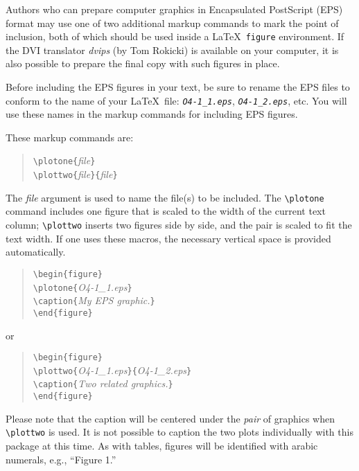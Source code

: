 \documentclass[11pt,twoside]{article}
\def\arg#1{{\it#1\/}}
\let\prog=\arg
\begin{document}
Authors who can prepare computer graphics in Encapsulated PostScript
(EPS) format may use one of two additional markup commands to mark the
point of inclusion, both of which should be used inside a \LaTeX\
{\tt figure} environment.  If the DVI translator \prog{dvips} (by Tom
Rokicki) is available on your computer, it is also possible to prepare the
final copy with such figures in place.  

Before including the EPS figures in your text, be sure to rename the
EPS files to conform to the name of your \LaTeX\ file:
{\tt {\it O4-1\_1.eps}}, {\tt {\it O4-1\_2.eps}}, etc. You will use
these names in the markup commands for including EPS figures.
 
These markup commands are:
\begin{quote} 
\verb+\plotone{+\arg{file}\verb+}+\\
\verb+\plottwo{+\arg{file}\verb+}{+\arg{file}\verb+}+
\end{quote}
 
The \arg{file} argument is used to name the file(s) to be included.  The
\verb+\plotone+ command includes one figure that is scaled to the width of
the current text column; \verb+\plottwo+ inserts two figures side by side,
and the pair is scaled to fit the text width.  If one uses these
macros, the necessary vertical space is provided automatically.
 
\begin{quote}
\verb+\begin{figure}+\\  
\verb+\plotone{+\arg{O4-1\_1.eps}\verb+}+\\
\verb+\caption{+\arg{My EPS graphic.}\verb+}+\\
\verb+\end{figure}+
\end{quote}
or
\begin{quote}
\verb+\begin{figure}+\\
\verb+\plottwo{+\arg{O4-1\_1.eps}\verb+}{+\arg{O4-1\_2.eps}\verb+}+\\
\verb+\caption{+\arg{Two related graphics.}\verb+}+\\
\verb+\end{figure}+
\end{quote}
Please note that the caption will be centered under the {\it pair\/} of
graphics when \verb+\plottwo+ is used.  It is not possible to caption the two
plots individually with this package at this time.  As with tables, figures
will be identified with arabic numerals, e.g., ``Figure 1.''
\end{document}
